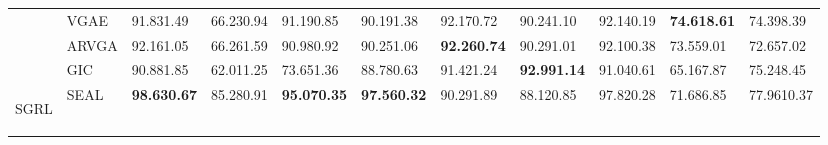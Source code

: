 \documentclass[sigconf, nonacm]{acmart}
\newcommand{\second}{\textcolor[rgb]{0.0, 0.0, 1.0}}
\newcommand{\third}{\textcolor[rgb]{0.55, 0.0, 0.55}}
\newcommand{\base}{\cellcolor[rgb]{1,0.949,0.8}}
\begin{document}
\begin{table*}[t]
{\begin{tabular}{p{12pt}|l|llll|lllll}
                       & VGAE                   & 91.83{\scriptsize1.49}                                     & 66.23{\scriptsize0.94}                                     & 91.19{\scriptsize0.85}                                     & 90.19{\scriptsize1.38}                                     & 92.17{\scriptsize0.72}                                     & 90.24{\scriptsize1.10}                                     & 92.14{\scriptsize0.19}                                     & \textbf{\third{74.61{\scriptsize8.61}}}                                     & 74.39{\scriptsize8.39}                                      \\
                    & ARVGA                  & 92.16{\scriptsize1.05}                                     & 66.26{\scriptsize1.59}                                     & 90.98{\scriptsize0.92}                                     & 90.25{\scriptsize1.06}                                     & \base \textbf{\third{92.26{\scriptsize0.74}}}       & 90.29{\scriptsize1.01}                                     & 92.10{\scriptsize0.38}                                     & 73.55{\scriptsize9.01}                                     & 72.65{\scriptsize7.02}                                      \\
                   & GIC                    & 90.88{\scriptsize1.85}                                     & 62.01{\scriptsize1.25}                                     & 73.65{\scriptsize1.36}                                     & 88.78{\scriptsize0.63}                                     & 91.42{\scriptsize1.24}                                     & \base \textbf{\third{92.99{\scriptsize1.14}}}       & 91.04{\scriptsize0.61}                                     & 65.16{\scriptsize7.87}                                     & 75.24{\scriptsize8.45}                                      \\ 
\hline
\multirow{3}{*}{{\begin{sideways}SGRL\end{sideways}}}                                                   & SEAL                   & \textbf{\third{98.63{\scriptsize0.67}}}                                     & 85.28{\scriptsize0.91}                                     & \textbf{\third{95.07{\scriptsize0.35}}}                                     & \textbf{\second{97.56{\scriptsize0.32}}}                                     & 90.29{\scriptsize1.89}                                     & 88.12{\scriptsize0.85}                                     & 97.82{\scriptsize0.28}                                     & 71.68{\scriptsize6.85}                                     & 77.96{\scriptsize10.37}                                     \\

\end{tabular}}
\end{table*}
\end{document}
